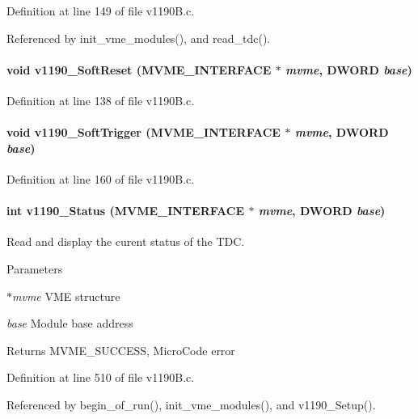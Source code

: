 Definition at line 149 of file v1190B.c.

Referenced by init\_\-vme\_\-modules(), and read\_\-tdc().
\paragraph[{v1190\_\-SoftReset}]{\setlength{\rightskip}{0pt plus 5cm}void v1190\_\-SoftReset ({\bf MVME\_\-INTERFACE} $\ast$ {\em mvme}, \/  {\bf DWORD} {\em base})}\hfill\label{v1190B_8c_a54b6135b6e898ce8f53efc28f9d21925}


Definition at line 138 of file v1190B.c.
\paragraph[{v1190\_\-SoftTrigger}]{\setlength{\rightskip}{0pt plus 5cm}void v1190\_\-SoftTrigger ({\bf MVME\_\-INTERFACE} $\ast$ {\em mvme}, \/  {\bf DWORD} {\em base})}\hfill\label{v1190B_8c_a00cdc1d39a5ff4e2dde5df17429a9fdf}


Definition at line 160 of file v1190B.c.
\paragraph[{v1190\_\-Status}]{\setlength{\rightskip}{0pt plus 5cm}int v1190\_\-Status ({\bf MVME\_\-INTERFACE} $\ast$ {\em mvme}, \/  {\bf DWORD} {\em base})}\hfill\label{v1190B_8c_a620a197083a0d776491f7bd620e2effd}
Read and display the curent status of the TDC. 
\begin{DoxyParams}{Parameters}
\item[{\em $\ast$mvme}]VME structure \item[{\em base}]Module base address \end{DoxyParams}
\begin{DoxyReturn}{Returns}
MVME\_\-SUCCESS, MicroCode error 
\end{DoxyReturn}


Definition at line 510 of file v1190B.c.

Referenced by begin\_\-of\_\-run(), init\_\-vme\_\-modules(), and v1190\_\-Setup().
